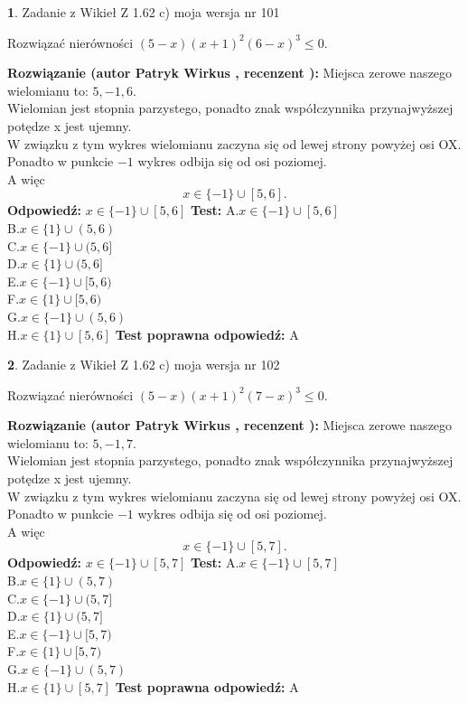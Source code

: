 \documentclass[12pt, a4paper]{article}
\theoremstyle{definition} %
\newtheorem{zad}{}
\newcommand{\zadStart}[1]{\begin{zad}#1\newline}
\newcommand{\zadStop}{\end{zad}}
\newcommand{\rozwStart}[2]{\noindent \textbf{Rozwiązanie (autor #1 , recenzent #2): }\newline}
\newcommand{\rozwStop}{\newline}
\newcommand{\odpStart}{\noindent \textbf{Odpowiedź:}\newline}
\newcommand{\odpStop}{\newline}
\newcommand{\testStart}{\noindent \textbf{Test:}\newline}
\newcommand{\testStop}{\newline}
\newcommand{\kluczStart}{\noindent \textbf{Test poprawna odpowiedź:}\newline}
\newcommand{\kluczStop}{\newline}
\begin{document}
\zadStart{Zadanie z Wikieł Z 1.62 c) moja wersja nr 101}

Rozwiązać nierówności $(5-x)(x+1)^{2}(6-x)^{3}\le0$.
\zadStop
\rozwStart{Patryk Wirkus}{}
Miejsca zerowe naszego wielomianu to: $5, -1, 6$.\\
Wielomian jest stopnia parzystego, ponadto znak współczynnika przy\linebreak najwyższej potędze x jest ujemny.\\ W związku z tym wykres wielomianu zaczyna się od lewej strony powyżej osi OX.\\
Ponadto w punkcie $-1$ wykres odbija się od osi poziomej.\\
A więc $$x \in \{-1\} \cup [5,6].$$
\rozwStop
\odpStart
$x \in \{-1\} \cup [5,6]$
\odpStop
\testStart
A.$x \in \{-1\} \cup [5,6]$\\
B.$x \in \{1\} \cup (5,6)$\\
C.$x \in \{-1\} \cup (5,6]$\\
D.$x \in \{1\} \cup (5,6]$\\
E.$x \in \{-1\} \cup [5,6)$\\
F.$x \in \{1\} \cup [5,6)$\\
G.$x \in \{-1\} \cup (5,6)$\\
H.$x \in \{1\} \cup [5,6]$
\testStop
\kluczStart
A
\kluczStop



\zadStart{Zadanie z Wikieł Z 1.62 c) moja wersja nr 102}

Rozwiązać nierówności $(5-x)(x+1)^{2}(7-x)^{3}\le0$.
\zadStop
\rozwStart{Patryk Wirkus}{}
Miejsca zerowe naszego wielomianu to: $5, -1, 7$.\\
Wielomian jest stopnia parzystego, ponadto znak współczynnika przy\linebreak najwyższej potędze x jest ujemny.\\ W związku z tym wykres wielomianu zaczyna się od lewej strony powyżej osi OX.\\
Ponadto w punkcie $-1$ wykres odbija się od osi poziomej.\\
A więc $$x \in \{-1\} \cup [5,7].$$
\rozwStop
\odpStart
$x \in \{-1\} \cup [5,7]$
\odpStop
\testStart
A.$x \in \{-1\} \cup [5,7]$\\
B.$x \in \{1\} \cup (5,7)$\\
C.$x \in \{-1\} \cup (5,7]$\\
D.$x \in \{1\} \cup (5,7]$\\
E.$x \in \{-1\} \cup [5,7)$\\
F.$x \in \{1\} \cup [5,7)$\\
G.$x \in \{-1\} \cup (5,7)$\\
H.$x \in \{1\} \cup [5,7]$
\testStop
\kluczStart
A
\kluczStop
\end{document}
